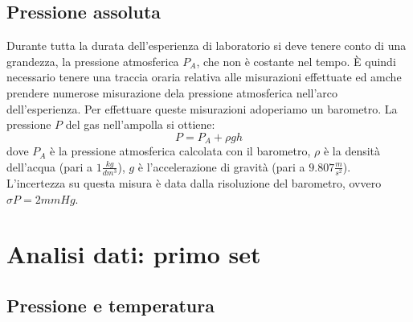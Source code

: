 \subsection{Pressione assoluta}
Durante tutta la durata dell'esperienza di laboratorio si deve tenere conto di una grandezza, la pressione atmosferica $P_A$, che non è costante nel tempo.
È quindi necessario tenere una traccia oraria relativa alle misurazioni effettuate ed amche prendere numerose misurazione dela pressione atmosferica nell'arco dell'esperienza.
Per effettuare queste misurazioni adoperiamo un barometro.
La pressione $P$ del gas nell'ampolla si ottiene:
\begin{equation}
P = P_A + \rho g h
\end{equation}
dove $P_A$ è la pressione atmosferica calcolata con il barometro, $\rho$ è la densità dell'acqua (pari a $1 \frac{kg}{dm^3}$), $g$
è l'accelerazione di gravità (pari a $9.807 \frac{m}{s^2}$).
L'incertezza su questa misura è data dalla risoluzione del barometro, ovvero $\sigma P = 2 mmHg$.

\section{Analisi dati: primo set}
\subsection{Pressione e temperatura}

